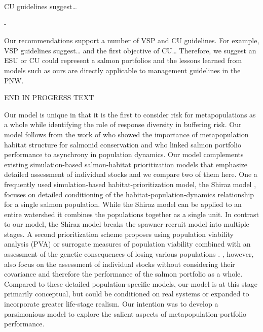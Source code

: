 CU guidelines \citep{dfo2005wsp} suggest\ldots{}

-

Our recommendations support a number of VSP and CU guidelines. For example, VSP guidelines suggest\ldots{} and the first objective of CU\ldots{} Therefore, we suggest an ESU or CU could represent a salmon portfolios and the lessons learned from models such as ours are directly applicable to management guidelines in the PNW.

END IN PROGRESS TEXT

Our model is unique in that it is the first to consider risk for metapopulations as a whole while identifying the role of response diversity in buffering risk. Our model follows from the work of \citet{cooper1999} who showed the importance of metapopulation habitat structure for salmonid conservation and \citet{moore2010} who linked salmon portfolio performance to asynchrony in population dynamics. Our model complements existing simulation-based salmon-habitat prioritization models that emphasize detailed assessment of individual stocks and we compare two of them here. One a frequently used simulation-based habitat-prioritization model, the Shiraz model \citep{scheuerell2006}, focuses on detailed conditioning of the habitat-population-dynamics relationship for a single salmon population. While the Shiraz model can be applied to an entire watershed it combines the populations together as a single unit. In contrast to our model, the Shiraz model breaks the spawner-recruit model into multiple stages. A second prioritization scheme proposes using population viability analysis (PVA) or surrogate measures of population viability combined with an assessment of the genetic consequences of losing various populations \citep{allendorf1997}. \citet{allendorf1997}, however, also focus on the assessment of individual stocks without considering their covariance and therefore the performance of the salmon portfolio as a whole. Compared to these detailed population-specific models, our model is at this stage primarily conceptual, but could be conditioned on real systems or expanded to incorporate greater life-stage realism. Our intention was to develop a parsimonious model to explore the salient aspects of metapopulation-portfolio performance.

